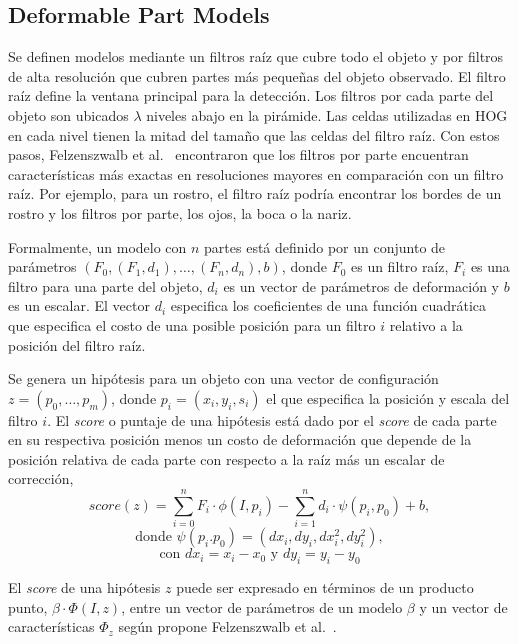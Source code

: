 \subsection{Deformable Part Models}\label{subsec:dpm}
Se definen modelos mediante un filtros raíz que cubre todo el objeto y por filtros de alta resolución que cubren partes más pequeñas del objeto observado. El filtro raíz define la ventana principal para la detección. Los filtros por cada parte del objeto son ubicados $\lambda$ niveles abajo en la pirámide. Las celdas utilizadas en HOG en cada nivel tienen la mitad del tamaño que las celdas del filtro raíz.
Con estos pasos, Felzenszwalb et al.~\cite{Felzenszwalb2010, Felzenszwalb2013} encontraron que los filtros por parte encuentran características más exactas en resoluciones mayores en comparación con un filtro raíz. Por ejemplo, para un rostro, el filtro raíz podría encontrar los bordes de un rostro y los filtros por parte, los ojos, la boca o la nariz.

Formalmente, un modelo con $n$ partes está definido por un conjunto de parámetros $(F_{0}, (F_{1},d_{1}), \dots, (F_{n}, d_{n}), b)$, donde $F_{0}$ es un filtro raíz, $F_{i}$ es una filtro para una parte del objeto, $d_{i}$ es un vector de parámetros de deformación y $b$ es un escalar. El vector $d_{i}$ especifica los coeficientes de una función cuadrática que especifica el costo de una posible posición para un filtro $i$ relativo a la posición del filtro raíz.

Se genera un hipótesis para un objeto con una vector de configuración $z = (p_{0}, \dots, p_{m})$, donde $p_{i} = (x_{i}, y_{i}, s_{i})$ el que especifica la posición y escala del filtro $i$. El \textit{score} o puntaje de una hipótesis está dado por el \textit{score} de cada parte en su respectiva posición menos un costo de deformación que depende de la posición relativa de cada parte con respecto a la raíz más un escalar de corrección,
\begin{equation}
	\mathit{score}(z) = \sum_{i=0}^n F_{i} \cdot \phi(I, p_{i}) - \sum_{i=1}^{n} d_{i} \cdot \psi(p_{i},p_{0}) + b,
\end{equation}
$$ \text{donde }\psi(p_i. p_0) = (dx_i, dy_i, dx^{2}_i, dy^{2}_i),$$
$$ \text{con } dx_i = x_i-x_0 \text{ y } dy_i = y_i-y_0$$

El \textit{score} de una hipótesis $z$ puede ser expresado en términos de un producto punto, $\beta \cdot \Phi(I, z)$, entre un vector de parámetros de un modelo $\beta$ y un vector de características $\Phi_z$ según propone Felzenszwalb et al.~\cite{Felzenszwalb2013}.


